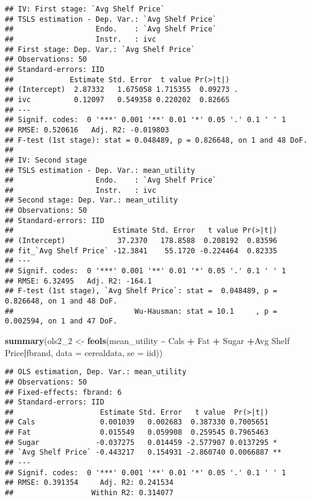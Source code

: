 \documentclass[
]{article}
\newenvironment{Shaded}{\begin{snugshade}}{\end{snugshade}}
\newcommand{\AttributeTok}[1]{\textcolor[rgb]{0.13,0.29,0.53}{#1}}
\newcommand{\FunctionTok}[1]{\textcolor[rgb]{0.13,0.29,0.53}{\textbf{#1}}}
\newcommand{\NormalTok}[1]{#1}
\newcommand{\OtherTok}[1]{\textcolor[rgb]{0.56,0.35,0.01}{#1}}
\newcommand{\SpecialCharTok}[1]{\textcolor[rgb]{0.81,0.36,0.00}{\textbf{#1}}}
\newcommand{\StringTok}[1]{\textcolor[rgb]{0.31,0.60,0.02}{#1}}
\begin{document}
\begin{verbatim}
## IV: First stage: `Avg Shelf Price`
## TSLS estimation - Dep. Var.: `Avg Shelf Price`
##                   Endo.    : `Avg Shelf Price`
##                   Instr.   : ivc
## First stage: Dep. Var.: `Avg Shelf Price`
## Observations: 50
## Standard-errors: IID 
##             Estimate Std. Error  t value Pr(>|t|)    
## (Intercept)  2.87332   1.675058 1.715355  0.09273 .  
## ivc          0.12097   0.549358 0.220202  0.82665    
## ---
## Signif. codes:  0 '***' 0.001 '**' 0.01 '*' 0.05 '.' 0.1 ' ' 1
## RMSE: 0.520616   Adj. R2: -0.019803
## F-test (1st stage): stat = 0.048489, p = 0.826648, on 1 and 48 DoF.
## 
## IV: Second stage
## TSLS estimation - Dep. Var.: mean_utility
##                   Endo.    : `Avg Shelf Price`
##                   Instr.   : ivc
## Second stage: Dep. Var.: mean_utility
## Observations: 50
## Standard-errors: IID 
##                       Estimate Std. Error   t value Pr(>|t|) 
## (Intercept)            37.2370   178.8588  0.208192  0.83596 
## fit_`Avg Shelf Price` -12.3841    55.1720 -0.224464  0.82335 
## ---
## Signif. codes:  0 '***' 0.001 '**' 0.01 '*' 0.05 '.' 0.1 ' ' 1
## RMSE: 6.32495   Adj. R2: -164.1
## F-test (1st stage), `Avg Shelf Price`: stat =  0.048489, p = 0.826648, on 1 and 48 DoF.
##                            Wu-Hausman: stat = 10.1     , p = 0.002594, on 1 and 47 DoF.
\end{verbatim}

\begin{Shaded}
\begin{Highlighting}[]
\FunctionTok{summary}\NormalTok{(ols2\_2 }\OtherTok{\textless{}{-}} \FunctionTok{feols}\NormalTok{(mean\_utility }\SpecialCharTok{\textasciitilde{}}\NormalTok{ Cals }\SpecialCharTok{+}\NormalTok{ Fat }\SpecialCharTok{+}\NormalTok{ Sugar }\SpecialCharTok{+}\StringTok{\textasciigrave{}}\AttributeTok{Avg Shelf Price}\StringTok{\textasciigrave{}}\SpecialCharTok{|}\NormalTok{fbrand, }\AttributeTok{data =}\NormalTok{ cerealdata,}
                     \AttributeTok{se =} \StringTok{\textquotesingle{}iid\textquotesingle{}}\NormalTok{))}
\end{Highlighting}
\end{Shaded}

\begin{verbatim}
## OLS estimation, Dep. Var.: mean_utility
## Observations: 50
## Fixed-effects: fbrand: 6
## Standard-errors: IID 
##                    Estimate Std. Error   t value  Pr(>|t|)    
## Cals               0.001039   0.002683  0.387330 0.7005651    
## Fat                0.015549   0.059908  0.259545 0.7965463    
## Sugar             -0.037275   0.014459 -2.577907 0.0137295 *  
## `Avg Shelf Price` -0.443217   0.154931 -2.860740 0.0066887 ** 
## ---
## Signif. codes:  0 '***' 0.001 '**' 0.01 '*' 0.05 '.' 0.1 ' ' 1
## RMSE: 0.391354     Adj. R2: 0.241534
##                  Within R2: 0.314077
\end{verbatim}
\end{document}
